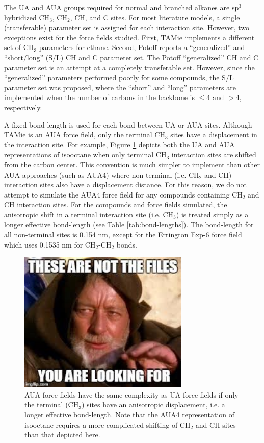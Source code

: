 \documentclass[preprint,review,12pt]{elsarticle}
\begin{document}
The UA and AUA groups required for normal and branched alkanes are sp$^3$ hybridized CH$_3$, CH$_2$, CH, and C sites. For most literature models, a single (transferable) parameter set is assigned for each interaction site. However, two exceptions exist for the force fields studied. First, TAMie implements a different set of CH$_3$ parameters for ethane. Second, Potoff reports a ``generalized'' and ``short/long'' (S/L) CH and C parameter set. The Potoff ``generalized'' CH and C parameter set is an attempt at a completely transferable set. However, since the ``generalized'' parameters performed poorly for some compounds, the S/L parameter set was proposed, where the ``short'' and ``long'' parameters are implemented when the number of carbons in the backbone is $\le 4$ and $> 4$, respectively. 

A fixed bond-length is used for each bond between UA or AUA sites. Although TAMie is an AUA force field, only the terminal CH$_3$ sites have a displacement in the interaction site. For example, Figure \ref{fig:AUA_isooctane} depicts both the UA and AUA representations of isooctane when only terminal CH$_3$ interaction sites are shifted from the carbon center. This convention is much simpler to implement than other AUA approaches (such as AUA4) where non-terminal (i.e. CH$_2$ and CH) interaction sites also have a displacement distance. For this reason, 
we do not attempt to simulate the AUA4 force field for any compounds containing CH$_2$ and CH interaction sites. For the compounds and force fields simulated, the anisotropic shift in a terminal interaction site (i.e. CH$_3$) is treated simply as a longer effective bond-length (see Table \ref{tab:bond-lengths}). The bond-length for all non-terminal sites is 0.154 nm, except for the Errington Exp-6 force field which uses 0.1535 nm for CH$_2$-CH$_2$ bonds.

\begin{figure}[htb!]
	\centering
	\includegraphics[width=3.2in]{empty_figure.jpg}
	\caption{AUA force fields have the same complexity as UA force fields if only the terminal (CH$_3$) sites have an anisotropic displacement, i.e. a longer effective bond-length. Note that the AUA4 representation of isooctane requires a more complicated shifting of CH$_2$ and CH sites than that depicted here.}
	\label{fig:AUA_isooctane}
\end{figure}
\end{document}
